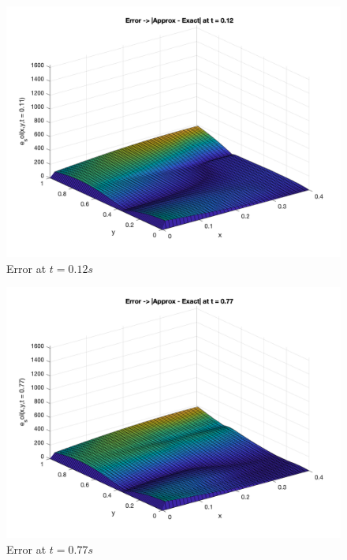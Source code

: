 \documentclass[conf]{new-aiaa}
\begin{document}
\begin{figure}[H]
    \begin{center}
    \includegraphics [width= .8\linewidth]{figures/Error_t012.png}
    \caption{Error at $t=0.12s$}
    \label{fig_errt012}
    \end{center}
\end{figure}

\begin{figure}[H]
    \begin{center}
    \includegraphics [width= .8\linewidth]{figures/Error_t077.png}
    \caption{Error at $t=0.77s$}
    \label{fig_errt077}
    \end{center}
\end{figure}
\end{document}
